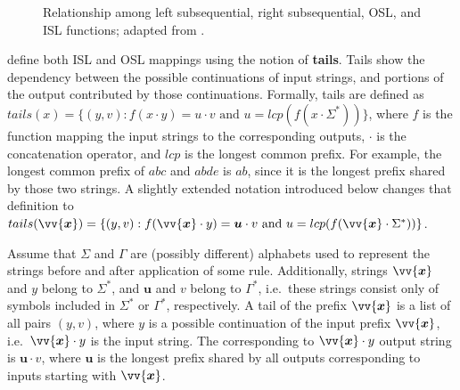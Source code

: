 \begin{figure}[h!]
\begin{center}
\caption{Relationship among left subsequential, right subsequential, OSL, and ISL functions; adapted from \citep{Chandlee2014}.}
\label{fig:ssqfunctionsmanyy}
\end{center}
\end{figure}





\cite{ChandleeEtAl2014} define both ISL and OSL mappings using the notion of \textbf{tails}.
Tails show the dependency between the possible continuations of input strings, and portions of the output contributed by those continuations.
Formally, tails are defined as $tails(x) = \{(y, v) : f(x\cdot y) = u\cdot v \textrm{ and } u = lcp(f(x\cdot \Sigma^*))\}$, where $f$ is the function mapping the input strings to the corresponding outputs, $\cdot$ is the concatenation operator, and $lcp$ is the longest common prefix.
For example, the longest common prefix of $abc$ and $abde$ is $ab$, since it is the longest prefix shared by those two strings.
A slightly extended notation introduced below changes that definition to $tails(\vv{\bm{x}}) = \{(y, v) : f(\vv{\bm{x}}\cdot y) = \bm{u}\cdot v \textrm{ and } u = lcp(f(\vv{\bm{x}}\cdot \Sigma^*))\}$.



Assume that $\Sigma$ and $\Gamma$ are (possibly different) alphabets used to represent the strings before and after application of some rule.
Additionally, strings $\vv{\bm{x}}$ and $y$ belong to $\Sigma^*$, and $\bm{u}$ and $v$ belong to $\Gamma^*$, i.e.\ these strings consist only of symbols included in $\Sigma^*$ or $\Gamma^*$, respectively.
A tail of the prefix $\vv{\bm{x}}$ is a list of all pairs $(y, v)$, where $y$ is a possible continuation of the input prefix $\vv{\bm{x}}$, i.e.\ $\vv{\bm{x}}\cdot y$ is the input string.
The corresponding to $\vv{\bm{x}}\cdot y$ output string is $\bm{u}\cdot v$, where $\bm{u}$ is the longest prefix shared by all outputs corresponding to inputs starting with $\vv{\bm{x}}$.



